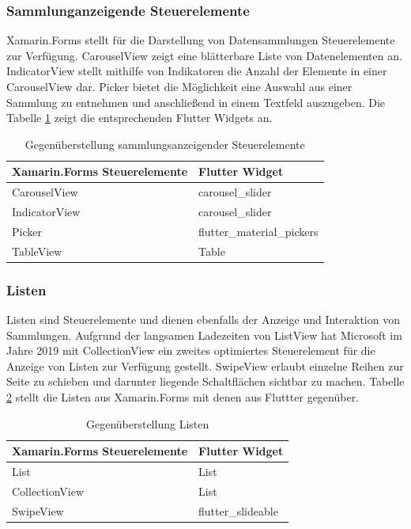 \subsubsection{Sammlunganzeigende Steuerelemente}

Xamarin.Forms stellt für die Darstellung von Datensammlungen Steuerelemente zur Verfügung.  \glq CarouselView\grq{}  zeigt eine blätterbare Liste von Datenelementen an.   \glq IndicatorView\grq{} stellt mithilfe von Indikatoren die Anzahl der Elemente in einer  \glq CarouselView\grq{} dar.  \glq Picker\grq{}  bietet die Möglichkeit eine Auswahl aus einer Sammlung zu entnehmen und anschließend in einem Textfeld auszugeben.   Die Tabelle \ref{tab:Collections} zeigt die entsprechenden Flutter Widgets an.


\begin{table}[!ht]
\begin{tabularx}{\textwidth}{X|X}
   \textbf{Xamarin.Forms Steuerelemente} & \textbf{Flutter Widget}  \\
\hline
	CarouselView		       		&  	carousel\_slider  		\\ 
	IndicatorView		       		&  	carousel\_slider		\\ 	
	Picker		       					&  	flutter\_material\_pickers		\\ 
	TableView		       				&  	Table		\\ 
\end{tabularx}
\caption{Gegenüberstellung sammlungsanzeigender Steuerelemente}
 \label{tab:Collections}
\end{table}


\subsubsection{Listen}

Listen sind  Steuerelemente und dienen ebenfalls der Anzeige und Interaktion von Sammlungen.  Aufgrund der langsamen Ladezeiten von \glq ListView\grq{} hat Microsoft im Jahre 2019 mit  \glq CollectionView\grq{}  ein zweites optimiertes Steuerelement für die Anzeige von Listen zur Verfügung gestellt.   \glq SwipeView\grq{} erlaubt einzelne Reihen zur Seite zu schieben und darunter liegende Schaltflächen sichtbar zu machen.  Tabelle \ref{tab:Listview} stellt die Listen aus Xamarin.Forms mit denen aus Fluttter gegenüber.  
\begin{table}[!ht]
\begin{tabularx}{\textwidth}{X|X}
   \textbf{Xamarin.Forms Steuerelemente} & \textbf{Flutter Widget}  \\
\hline
	List		       				&  	List 		\\ 
	CollectionView		       				&  	List 		\\ 
	SwipeView		       		&  	flutter\_slideable 		\\ 
\end{tabularx}
\caption{Gegenüberstellung Listen}
 \label{tab:Listview}
\end{table}

